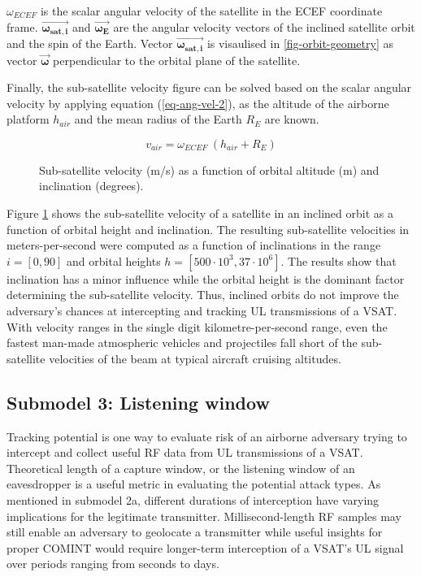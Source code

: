 \documentclass[english, 12pt, a4paper, elec, utf8, a-1b, online]{aaltothesis}
\begin{document}
$\omega_{ECEF}$ is the scalar angular velocity of the satellite in the ECEF coordinate frame.
$\bm{\vec{\omega_{sat, i}}}$ and $\bm{\vec{\omega_{E}}}$ are the angular velocity vectors of the inclined satellite orbit and the spin of the Earth. Vector $\bm{\vec{\omega_{sat, i}}}$ is visaulised in \ref{fig-orbit-geometry} as vector $\bm{\vec{\omega}}$ perpendicular to the orbital plane of the satellite.

Finally, the sub-satellite velocity figure can be solved based on the scalar angular velocity by applying equation (\ref{eq-ang-vel-2}), as the altitude of the airborne platform $h_{air}$ and the mean radius of the Earth $R_E$ are known.

\begin{equation}
  v_{air} = \omega_{ECEF}\ (h_{air} + R_E)
\end{equation}

\begin{figure}[h]
  \centering
  
  \caption{Sub-satellite velocity (m/s) as a function of orbital altitude (m) and inclination (degrees).}
  \label{fig-subsat-velocity-inclined}
\end{figure}
Figure \ref{fig-subsat-velocity-inclined} shows the sub-satellite velocity of a satellite in an inclined orbit as a function of orbital height and inclination.
The resulting sub-satellite velocities in meters-per-second were computed as a function of inclinations in the range $i = [0,90]$ and orbital heights $h = [500 \cdot 10^3, 37 \cdot 10^6]$.
The results show that inclination has a minor influence while the orbital height is the dominant factor determining the sub-satellite velocity.
Thus, inclined orbits do not improve the adversary's chances at intercepting and tracking UL transmissions of a VSAT.
With velocity ranges in the single digit kilometre-per-second range, even the fastest man-made atmospheric vehicles and projectiles fall short of the sub-satellite velocities of the beam at typical aircraft cruising altitudes.

\subsection{Submodel 3: Listening window} \label{ch-results-submodel-3-window}
Tracking potential is one way to evaluate risk of an airborne adversary trying to intercept and collect useful RF data from UL transmissions of a VSAT.
Theoretical length of a capture window, or the listening window of an eavesdropper is a useful metric in evaluating the potential attack types.
As mentioned in submodel 2a, different durations of interception have varying implications for the legitimate transmitter.
Millisecond-length RF samples may still enable an adversary to geolocate a transmitter while useful insights for proper COMINT would require longer-term interception of a VSAT's UL signal over periods ranging from seconds to days.
\end{document}
